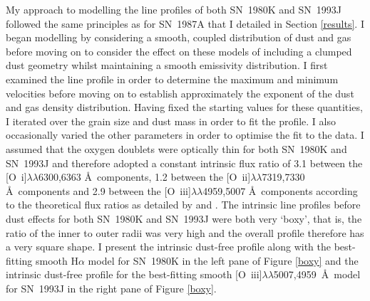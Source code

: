 My approach to modelling the line profiles of both SN~1980K and SN~1993J followed the same principles as for SN~1987A that I detailed in Section \ref{results}.  I began modelling by considering a smooth, coupled distribution of dust and gas before moving on to consider the effect on these models of including a clumped dust geometry whilst maintaining a smooth emissivity distribution.  I first examined the line profile in order to determine the maximum and minimum velocities before moving on to establish approximately the exponent of the dust and gas density distribution.  Having fixed the starting values for these quantities, I iterated over the grain size and dust mass in order to fit the profile.  I also occasionally  varied the other parameters in order to optimise the fit to the data. I assumed that the oxygen doublets were optically thin for both SN~1980K and SN~1993J and therefore adopted a constant intrinsic flux ratio of 3.1 between the [O~{\sc i}]$\lambda\lambda$6300,6363 \AA\  components, 1.2 between the [O~{\sc ii}]$\lambda\lambda$7319,7330 \AA\  components and 2.9 between the [O~{\sc iii}]$\lambda\lambda$4959,5007 \AA\  components according to the theoretical flux ratios as detailed by \citet{Zeippen1987} and \citet{Storey2000}.  The intrinsic line profiles before dust effects for both SN~1980K and SN~1993J were both very `boxy', that is, the ratio of the inner to outer radii was very high and the overall profile therefore has a very square shape.  I present the intrinsic dust-free profile along with the best-fitting smooth H$\alpha$ model for SN~1980K in the left pane of Figure \ref{boxy} and the intrinsic dust-free profile for the best-fitting smooth [O~{\sc iii}]$\lambda\lambda$5007,4959~\AA\ model for SN~1993J in the right pane of Figure \ref{boxy}.

